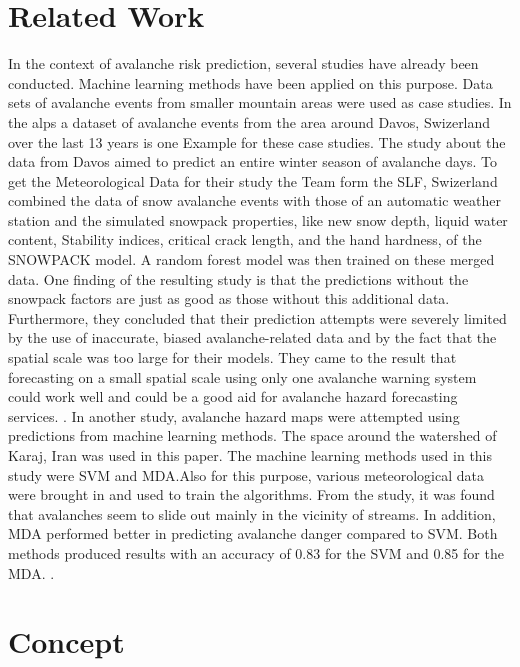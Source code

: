 \documentclass[12pt,a4paper]{article}
\begin{document}
\section{Related Work}
In the context of avalanche risk prediction, several studies have already been conducted. Machine learning methods have been applied on this purpose. Data sets of avalanche events from smaller mountain areas were used as case studies. In the alps a dataset of avalanche events from the area around Davos, Swizerland over the last 13 years is one Example for these case studies. The study about the data from Davos aimed to predict an entire winter season of avalanche days.
To get the Meteorological Data for their study the Team form the SLF, Swizerland combined the data of snow avalanche events with those of an automatic weather station and the simulated snowpack properties, like new snow depth, liquid water content, Stability indices, critical crack length,  and the hand hardness,  of the SNOWPACK model. A random forest model was then trained on these merged data. One finding of the resulting study is that the predictions without the snowpack factors are just as good as those without this additional data. Furthermore, they concluded that their prediction attempts were severely limited by the use of inaccurate, biased avalanche-related data and by the fact that the spatial scale was too large for their models. They came to the result that forecasting on a small spatial scale using only one avalanche warning system could work well and could be a good aid for avalanche hazard forecasting services. \autocite{Harvey:2016}.
In another study, avalanche hazard maps were attempted using predictions from machine learning methods.  The space around the watershed of Karaj, Iran was used in this paper. The machine learning methods used in this study were SVM and MDA.Also for this purpose, various meteorological data were brought in and used to train the algorithms. From the study, it was found that avalanches seem to slide out mainly in the vicinity of streams. In addition, MDA performed better in predicting avalanche danger compared to SVM. Both methods produced results with an accuracy of 0.83 for the SVM and 0.85 for the MDA. \autocites{Bahram:2019}.








\section{Concept}
\end{document}
